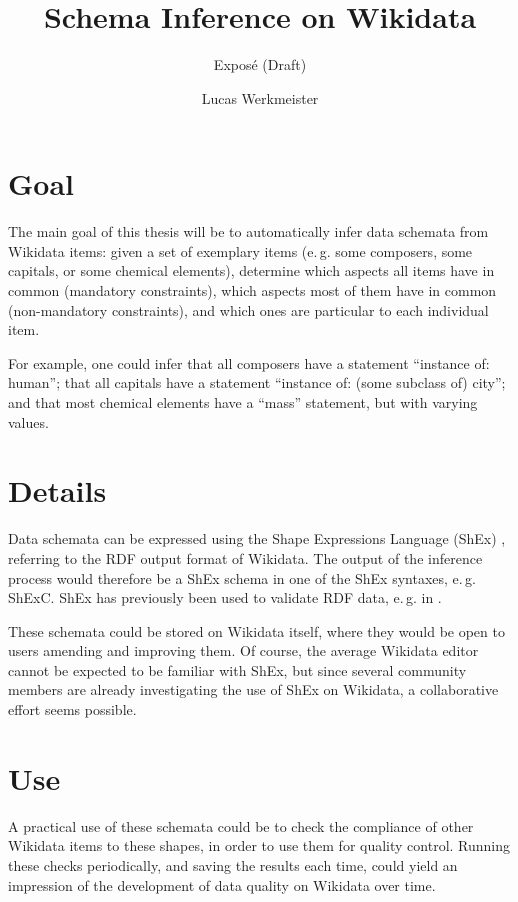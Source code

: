 \documentclass{scrartcl}
\title{Schema Inference on Wikidata}
\subtitle{Exposé (Draft)}
\author{Lucas Werkmeister}
\begin{document}
\maketitle

\section{Goal}

The main goal of this thesis will be to automatically infer data schemata from Wikidata items:
given a set of exemplary items (e.\,g. some composers, some capitals, or some chemical elements),
determine which aspects all items have in common (mandatory constraints),
which aspects most of them have in common (non-mandatory constraints),
and which ones are particular to each individual item.

For example, one could infer that all composers have a statement “instance of: human”;
that all capitals have a statement “instance of: (some subclass of) city”;
and that most chemical elements have a “mass” statement, but with varying values.

\section{Details}

Data schemata can be expressed using the Shape Expressions Language (ShEx) \cite{shex},
referring to the RDF output format of Wikidata.
The output of the inference process would therefore be a ShEx schema in one of the ShEx syntaxes, e.\,g. ShExC.
ShEx has previously been used to validate RDF data, e.\,g. in \cite{SOLBRIG201790}.

These schemata could be stored on Wikidata itself,
where they would be open to users amending and improving them.
Of course, the average Wikidata editor cannot be expected to be familiar with ShEx,
but since several community members are already investigating the use of ShEx on Wikidata,
a collaborative effort seems possible.

\section{Use}

A practical use of these schemata could be to check the compliance of other Wikidata items to these shapes,
in order to use them for quality control.
Running these checks periodically, and saving the results each time,
could yield an impression of the development of data quality on Wikidata over time.
\end{document}
